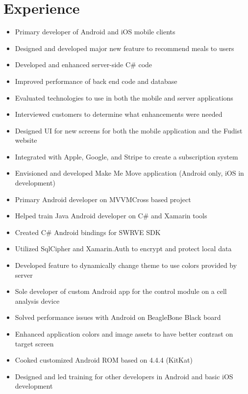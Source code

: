 \documentclass[12pt,letterpaper,sans]{moderncv}
\begin{document}
\section{Experience}
    \begin{itemize}[leftmargin=1.24in]
    	\item Primary developer of Android and iOS mobile clients
		\item Designed and developed major new feature to recommend meals to users
		\item Developed and enhanced server-side C\# code
    	\item Improved performance of back end code and database
    	\item Evaluated technologies to use in both the mobile and server applications
    	\item Interviewed customers to determine what enhancements were needed
    	\item Designed UI for new screens for both the mobile application and the Fudist website
    	\item Integrated with Apple, Google, and Stripe to create a subscription system	
    	\item Envisioned and developed Make Me Move application (Android only, iOS in development)
    \end{itemize}
    \begin{itemize}[leftmargin=1.24in]
    	\item Primary Android developer on MVVMCross based project
    	\item Helped train Java Android developer on C\# and Xamarin tools
    	\item Created C\# Android bindings for SWRVE SDK
    	\item Utilized SqlCipher and Xamarin.Auth to encrypt and protect local data
    	\item Developed feature to dynamically change theme to use colors provided by server
    \end{itemize} 
	\begin{itemize}[leftmargin=1.24in]
		\item Sole developer of custom Android app for the control module on a cell analysis device
		\item Solved performance issues with Android on BeagleBone Black board
		\item Enhanced application colors and image assets to have better contrast on target screen
		\item Cooked customized Android ROM based on 4.4.4 (KitKat)
		\item Designed and led training for other developers in Android and basic iOS development
	\end{itemize}
\end{document}
